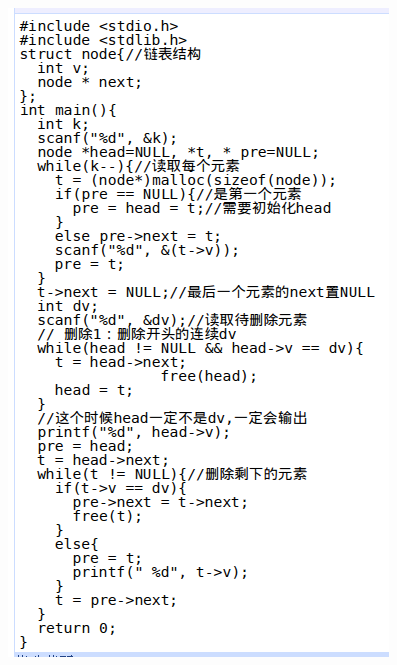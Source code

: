 \documentclass[color=usenames,dvipsnames]{beamer}
\begin{document}
{{\begin{columns}
     \column{0.7\hsize}
     \includegraphics[width=0.6\hsize]{pic/删除数组中的元素（链表）-good.png}
     \end{columns}
     }
}
\end{document}
